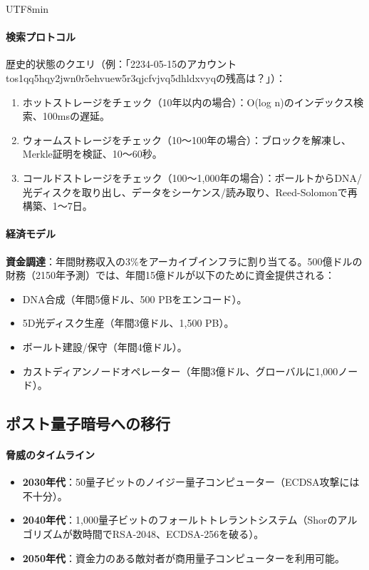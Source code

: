 \documentclass[11pt]{article}
\begin{document}
\begin{CJK}{UTF8}{min}
\paragraph{検索プロトコル}
歴史的状態のクエリ（例：「2234-05-15のアカウントtos1qq5hqy2jwn0r5ehvuew5r3qjcfvjvq5dhldxvyqの残高は？」）：
\begin{enumerate}[noitemsep]
  \item ホットストレージをチェック（10年以内の場合）：O(log n)のインデックス検索、100msの遅延。
  \item ウォームストレージをチェック（10〜100年の場合）：ブロックを解凍し、Merkle証明を検証、10〜60秒。
  \item コールドストレージをチェック（100〜1,000年の場合）：ボールトからDNA/光ディスクを取り出し、データをシーケンス/読み取り、Reed-Solomonで再構築、1〜7日。
\end{enumerate}

\paragraph{経済モデル}
\textbf{資金調達}：年間財務収入の3\%をアーカイブインフラに割り当てる。500億ドルの財務（2150年予測）では、年間15億ドルが以下のために資金提供される：
\begin{itemize}[noitemsep]
  \item DNA合成（年間5億ドル、500 PBをエンコード）。
  \item 5D光ディスク生産（年間3億ドル、1,500 PB）。
  \item ボールト建設/保守（年間4億ドル）。
  \item カストディアンノードオペレーター（年間3億ドル、グローバルに1,000ノード）。
\end{itemize}

\subsection{ポスト量子暗号への移行}

\paragraph{脅威のタイムライン}
\begin{itemize}[noitemsep]
  \item \textbf{2030年代}：50量子ビットのノイジー量子コンピューター（ECDSA攻撃には不十分）。
  \item \textbf{2040年代}：1,000量子ビットのフォールトトレラントシステム（Shorのアルゴリズムが数時間でRSA-2048、ECDSA-256を破る）。
  \item \textbf{2050年代}：資金力のある敵対者が商用量子コンピューターを利用可能。
\end{itemize}


\end{CJK}
\end{document}
